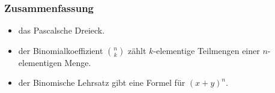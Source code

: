 \documentclass{beamer}
\renewcommand{\ae}{\"a}
\newcommand{\ue}{\"u}
\begin{document}
\begin{frame}\frametitle{Zusammenfassung}
\begin{itemize}
	\item das Pascalsche Dreieck.
\item der Binomialkoeffizient $\binom nk$ z\ae hlt $k$-elementige Teilmengen einer $n$-elementigen Menge.
\item der Binomische Lehrsatz gibt eine Formel f\ue r $(x+y)^n$.
\end{itemize}
\end{frame}
\end{document}
